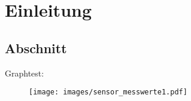 \chapter{Einleitung}
\section{Abschnitt}
Graphtest:
\begin{figure}[hb] \centering
  \texttt{[image: images/sensor\_messwerte1.pdf]}
 \end{figure}
